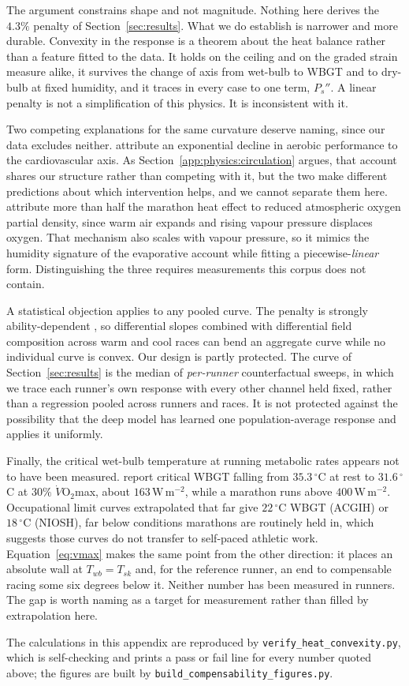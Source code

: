 The argument constrains shape and not magnitude. Nothing here derives the
$4.3\%$ penalty of Section~\ref{sec:results}. What we do establish is narrower
and more durable. Convexity in the response is a theorem about the heat balance
rather than a feature fitted to the data. It holds on the ceiling and on the
graded strain measure alike, it survives the change of axis from wet-bulb to
WBGT and to dry-bulb at fixed humidity, and it traces in every case to one term,
$P_s''$. A linear penalty is not a simplification of this physics. It is
inconsistent with it.

Two competing explanations for the same curvature deserve naming, since our data
excludes neither. \citet{cheuvront2010} attribute an exponential decline in
aerobic performance to the cardiovascular axis. As
Section~\ref{app:physics:circulation} argues, that account shares our structure
rather than competing with it, but the two make different predictions about
which intervention helps, and we cannot separate them here. \citet{wang2024}
attribute more than half the marathon heat effect to reduced atmospheric oxygen
partial density, since warm air expands and rising vapour pressure displaces
oxygen. That mechanism also scales with vapour pressure, so it mimics the
humidity signature of the evaporative account while fitting a
piecewise-\emph{linear} form. Distinguishing the three requires measurements
this corpus does not contain.

A statistical objection applies to any pooled curve. The penalty is strongly
ability-dependent \citep{ely2007}, so differential slopes combined with
differential field composition across warm and cool races can bend an aggregate
curve while no individual curve is convex. Our design is partly protected. The
curve of Section~\ref{sec:results} is the median of \emph{per-runner}
counterfactual sweeps, in which we trace each runner's own response with every
other channel held fixed, rather than a regression pooled across runners and
races. It is not protected against the possibility that the deep model has
learned one population-average response and applies it uniformly.

Finally, the critical wet-bulb temperature at running metabolic rates appears
not to have been measured. \citet{wolf2021} report critical WBGT falling from
$35.3\,^{\circ}$C at rest to $31.6\,^{\circ}$C at $30\%$
$\dot{V}\mathrm{O}_2$max, about $163\,\mathrm{W\,m^{-2}}$, while a marathon runs
above $400\,\mathrm{W\,m^{-2}}$. Occupational limit curves extrapolated that far
give $22\,^{\circ}$C WBGT (ACGIH) or $18\,^{\circ}$C (NIOSH), far below
conditions marathons are routinely held in, which suggests those curves do not
transfer to self-paced athletic work. Equation~\eqref{eq:vmax} makes the same
point from the other direction: it places an absolute wall at $T_{wb} = T_{sk}$
and, for the reference runner, an end to compensable racing some six degrees
below it. Neither number has been measured in runners. The gap is worth naming
as a target for measurement rather than filled by extrapolation here.

The calculations in this appendix are reproduced by
\texttt{verify\_heat\_convexity.py}, which is self-checking and prints a pass or
fail line for every number quoted above; the figures are built by
\texttt{build\_compensability\_figures.py}.
